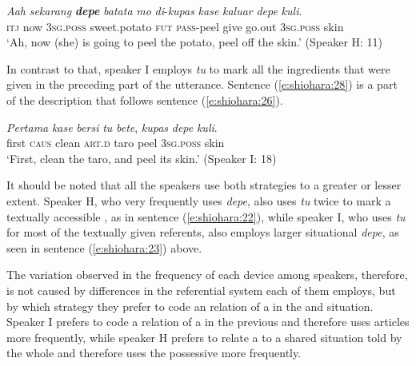 \documentclass[output=paper
,modfonts
,nonflat]{langsci/langscibook}
\begin{document}
\begin{exe}
	\ex\label{e:shiohara:27}
	\gll \textit{Aah} \textit{sekarang} \textbf{\textit{depe}} \textit{batata} \textit{mo} \textit{di}-\textit{kupas} \textit{kase} \textit{kaluar} \textit{depe} \textit{kuli}.\\
	\textsc{itj} now \textsc{3sg.poss} sweet.potato \textsc{fut} \textsc{pass}-peel give go.out \textsc{3sg.poss} skin \\
	\glt ‘Ah, now (she) is going to peel the potato, peel off the skin.’ \hfill{(Speaker H: 11)}
\end{exe}

\noindent
In contrast to that, speaker I employs \textit{tu} to mark all the ingredients that were given in the preceding part of the utterance. Sentence (\ref{e:shiohara:28}) is a part of the description that follows sentence (\ref{e:shiohara:26}).

\begin{exe}
	\ex\label{e:shiohara:28}
	\gll \textit{Pertama}  \textit{kase}   \textit{bersi}   \textit{tu}   \textit{bete},   \textit{kupas} \textit{depe}   \textit{kuli}.\\
	first    \textsc{caus}  clean  \textsc{art.d}  taro  peel  \textsc{3sg.poss}  skin\\
	\glt ‘First, clean the taro, and peel its skin.’ \hfill{(Speaker I: 18)}
\end{exe}

\noindent
It should be noted that all the speakers use both strategies to a greater or lesser extent. Speaker H, who very frequently uses \textit{depe}, also uses \textit{tu} twice to mark a textually accessible , as in sentence (\ref{e:shiohara:22}), while speaker I, who uses \textit{tu} for most of the textually given referents, also employs larger situational \textit{depe}, as seen in sentence (\ref{e:shiohara:23}) above.

The variation observed in the frequency of each device among speakers, therefore, is not caused by differences in the referential system each of them employs, but by which strategy they prefer to code an  relation of a  in the  and  situation. Speaker I prefers to code a relation of a  in the previous  and therefore uses  articles more frequently, while speaker H prefers to relate a  to a shared situation told by the whole  and therefore uses the possessive more frequently.
	
\end{document}
